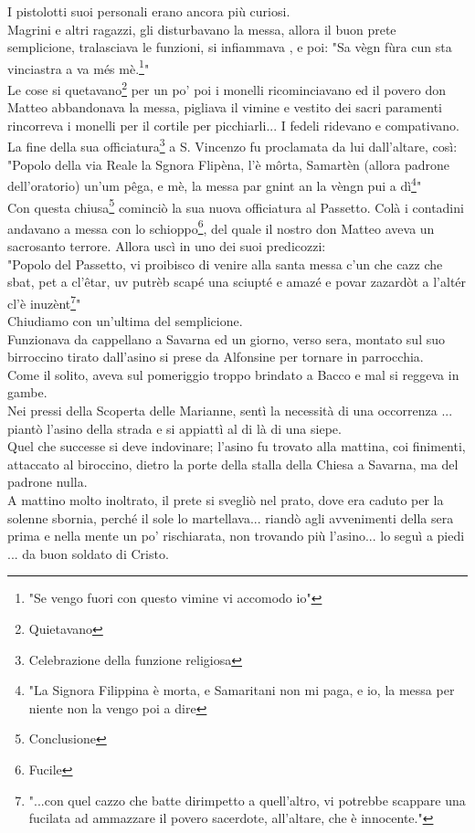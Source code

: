 I pistolotti suoi personali erano ancora più curiosi.\\
Magrini e altri ragazzi, gli disturbavano la messa, allora il buon prete semplicione, tralasciava le funzioni, si infiammava , e poi: "Sa vègn fùra cun sta vinciastra a va més mè.\footnote{"Se vengo fuori con questo vimine vi accomodo io"}"\\
Le cose si quetavano\footnote{Quietavano} per un po' poi i monelli ricominciavano ed il povero don Matteo abbandonava la messa, pigliava il vimine e vestito dei sacri paramenti rincorreva i monelli per il cortile per picchiarli... I fedeli ridevano e compativano. \\
La fine della sua officiatura\footnote{Celebrazione della funzione religiosa} a S. Vincenzo fu proclamata da lui dall'altare, così:\\
"Popolo della via Reale la Sgnora Flipèna, l'è môrta, Samartèn (allora padrone dell'oratorio) un'um pêga, e mè, la messa par gnint an la vèngn pui a dì\footnote{"La Signora Filippina è morta, e Samaritani non mi paga, e io, la messa per niente non la vengo poi a dire}"\\
Con questa chiusa\footnote{Conclusione} cominciò la sua nuova officiatura al Passetto. Colà i contadini andavano a messa con lo schioppo\footnote{Fucile}, del quale il nostro don Matteo aveva un sacrosanto terrore. Allora uscì in uno dei suoi predicozzi:\\
"Popolo del Passetto, vi proibisco di venire alla santa messa c'un che cazz che sbat, pet a cl'êtar, uv putrèb scapé una sciupté e amazé e povar zazardòt a l'altér cl'è inuzènt\footnote{"...con quel cazzo che batte dirimpetto a quell'altro, vi potrebbe scappare una fucilata ad ammazzare il povero sacerdote, all'altare, che è innocente."}"\\
Chiudiamo con un'ultima del semplicione.\\Funzionava da cappellano a Savarna ed un giorno, verso sera, montato sul suo birroccino tirato dall'asino si prese da Alfonsine per tornare in parrocchia. \\
Come il solito, aveva sul pomeriggio troppo brindato a Bacco e mal si reggeva in gambe.\\
Nei pressi della Scoperta delle Marianne, sentì la necessità di una occorrenza ... piantò l'asino della strada e si appiattì al di là di una siepe.\\
Quel che successe si deve indovinare; l'asino fu trovato alla mattina, coi finimenti, attaccato al biroccino, dietro la porte della stalla della Chiesa a Savarna, ma del padrone nulla.\\
A mattino molto inoltrato, il prete si svegliò nel prato, dove era caduto per la solenne sbornia, perché il sole lo martellava... riandò agli avvenimenti della sera prima e nella mente un po' rischiarata, non trovando più l'asino... lo seguì a piedi ... da buon soldato di Cristo.

